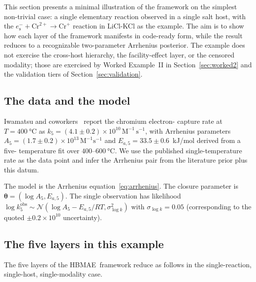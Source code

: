 \documentclass[12pt]{article}
\theoremstyle{plain}
\theoremstyle{definition}
\theoremstyle{remark}
\newcommand{\eS}{\ensuremath{e_{\mathrm{s}}^{-}}\xspace}
\newcommand{\HBMAE}{HBMAE\xspace}
\begin{document}
This section presents a minimal illustration of the framework on the
simplest non-trivial case: a single elementary reaction observed in a
single salt host, with the
$\eS+\mathrm{Cr}^{2+}\to\mathrm{Cr}^+$ reaction in LiCl-KCl as the example.
The aim is to show how each layer of the framework manifests in code-ready
form, while the result reduces to a recognizable two-parameter Arrhenius
posterior.  The example does not exercise the cross-host hierarchy, the
facility-effect layer, or the censored modality; those are exercised by
Worked Example~II in Section~\ref{sec:worked2} and the validation tiers of
Section~\ref{sec:validation}.

\subsection{The data and the model}\label{sec:worked1:setup}

Iwamatsu and coworkers~\citep{Iwamatsu2026} report the chromium electron-
capture rate at $T = \SI{400}{\celsius}$ as
$k_5 = (4.1\pm 0.2)\times 10^{10}\,\mathrm{M}^{-1}\,\mathrm{s}^{-1}$, with
Arrhenius parameters $A_5 = (1.7\pm 0.2)\times 10^{13}\,\mathrm{M}^{-1}
\mathrm{s}^{-1}$ and $E_{a,5} = 33.5\pm 0.6$~kJ/mol derived from a five-
temperature fit over $400$--$\SI{600}{\celsius}$.  We use the published
single-temperature rate as the data point and infer the Arrhenius pair from
the literature prior plus this datum.

The model is the Arrhenius equation~\eqref{eq:arrhenius}.  The closure
parameter is $\boldsymbol\theta = (\log A_5, E_{a,5})$.  The single
observation has likelihood
$\log k_5^{\mathrm{obs}} \sim \mathcal{N}(\log A_5 - E_{a,5}/RT,
\sigma_{\log k}^2)$ with $\sigma_{\log k} = 0.05$ (corresponding to the
quoted $\pm 0.2\times 10^{10}$ uncertainty).

\subsection{The five layers in this example}

The five layers of the \HBMAE\ framework reduce as follows in the
single-reaction, single-host, single-modality case.
\end{document}
